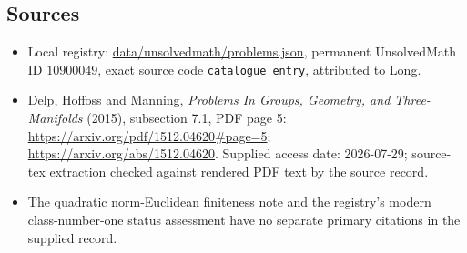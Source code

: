 \documentclass[11pt]{article}
\begin{document}
\subsection{Sources}
\begin{itemize}
\item Local registry: \url{data/unsolvedmath/problems.json}, permanent UnsolvedMath ID $10900049$, exact source code \texttt{catalogue entry}, attributed to Long.
\item Delp, Hoffoss and Manning, \emph{Problems In Groups, Geometry, and Three-Manifolds} (2015), subsection 7.1, PDF page 5: \url{https://arxiv.org/pdf/1512.04620#page=5}; \url{https://arxiv.org/abs/1512.04620}. Supplied access date: 2026-07-29; source-tex extraction checked against rendered PDF text by the source record.
\item The quadratic norm-Euclidean finiteness note and the registry's modern class-number-one status assessment have no separate primary citations in the supplied record.
\end{itemize}
\end{document}
